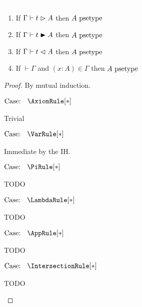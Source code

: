 \begin{lemma}
    \textcolor{white}{\_}
    \begin{enumerate}
        \item If $\Gamma \vdash t \vartriangleright A$ then $A~\mbox{\normalfont psetype}$
        \item If $\Gamma \vdash t \blacktriangleright A$ then $A~\mbox{\normalfont psetype}$
        \item If $\Gamma \vdash t \vartriangleleft A$ then $A~\mbox{\normalfont psetype}$
        \item If $\vdash \Gamma$ and $(x : A) \in \Gamma$ then $A~\mbox{\normalfont psetype}$
    \end{enumerate}
    \label{lem:2:infer_is_psetype}
\end{lemma}
\begin{proof}
    By mutual induction.

    $\text{Case: }\begin{array}{c} \AxiomRule[*] \end{array}$
    \begin{proofcase}
        Trivial
    \end{proofcase}

    $\text{Case: }\begin{array}{c} \VarRule[*] \end{array}$
    \begin{proofcase}
        Immediate by the IH.
    \end{proofcase}

    $\text{Case: }\begin{array}{c} \PiRule[*] \end{array}$
    \begin{proofcase}
        TODO
    \end{proofcase}

    $\text{Case: }\begin{array}{c} \LambdaRule[*] \end{array}$
    \begin{proofcase}
        TODO
    \end{proofcase}

    $\text{Case: }\begin{array}{c} \AppRule[*] \end{array}$
    \begin{proofcase}
        TODO
    \end{proofcase}

    $\text{Case: }\begin{array}{c} \IntersectionRule[*] \end{array}$
    \begin{proofcase}
        TODO
    \end{proofcase}


\end{proof}
